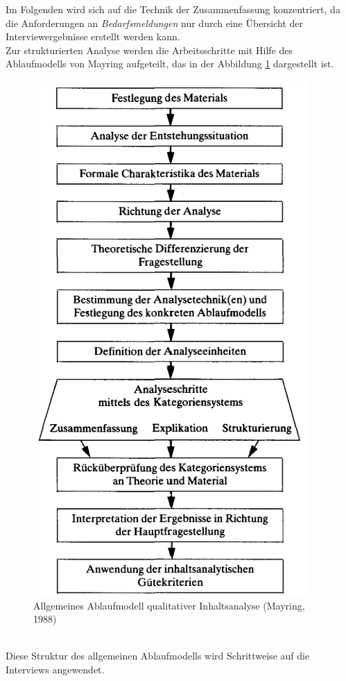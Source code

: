 Im Folgenden wird sich auf die Technik der Zusammenfassung konzentriert, da die Anforderungen an \emph{Bedarfsmeldungen} nur durch eine Übersicht der Interviewergebnisse erstellt werden kann.\\

Zur strukturierten Analyse werden die Arbeitsschritte mit Hilfe des Ablaufmodells von Mayring aufgeteilt, das in der Abbildung \ref{fig:ablaufmodell} dargestellt ist.
\begin{figure}[H]%
	\centering  
	\includegraphics[scale=1]{Abbildungen/Ablaufmodell.png}
	\caption{Allgemeines Ablaufmodell qualitativer Inhaltsanalyse (Mayring, 1988) \cite{mayring2019qualitative}}
	\label{fig:ablaufmodell}
\end{figure}\mbox{} \\
Diese Struktur des allgemeinen Ablaufmodells wird Schrittweise auf die Interviews angewendet.
